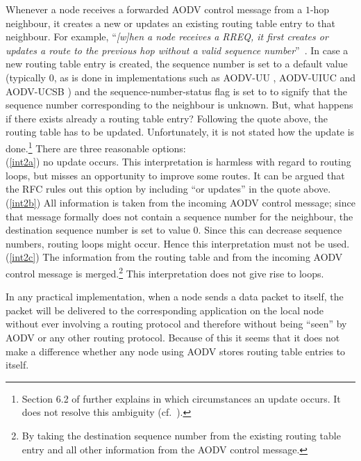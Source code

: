 \documentclass[letterpaper]{sig-alternate-pages}
\newcommand{\rte}{routing table entry\xspace}
\newcommand{\rtes}{routing table entries\xspace}
\renewcommand{\sf}{\it}
\begin{document}
Whenever a node receives a forwarded AODV control message from a $1$-hop neighbour, it creates a new or updates an existing \rte to that neighbour.
For example, ``{\sf [w]hen a node receives a RREQ, it first creates or updates a route to
   the previous hop without a valid sequence number\/}''~\cite[Sect.~6.5]{rfc3561}.
In case a new \rte is created, the sequence number is set to a default value (typically $0$, as is done in implementations such as AODV-UU \cite{AODVUU}, AODV-UIUC \cite{Kawadia03} and AODV-UCSB \cite{CB04}) and the sequence-number-status flag is set to {\unkno} to signify that the sequence number corresponding to the neighbour is unknown. 
But, what happens if there exists already a \rte?
Following the quote above, the routing table has to be updated. Unfortunately, it is not stated 
how the update is done.\footnote{Section 6.2 of \cite{rfc3561} further explains in which
  circumstances an update occurs. It does not resolve this ambiguity (cf.~\cite{TR11}).}
There are three reasonable options:\\
(\ref{int2a}) no update occurs.
This interpretation is harmless with regard to routing loops, but misses an opportunity to improve some routes.
It can be argued that the RFC rules out this option by including ``or updates'' in the quote above.\\
(\ref{int2b}) All information is taken from the incoming AODV control message;
since that message formally does not contain a sequence number for the neighbour, the destination
sequence number is set to value $0$.
Since this can decrease sequence numbers, 
routing loops might occur. Hence this interpretation must not be used.\\
(\ref{int2c}) The information from the routing table
and from the incoming AODV control message is
merged.\footnote{By taking the destination sequence number from the
  existing \rte and all other information from the AODV
  control message.}
This interpretation does not give rise to 
loops.

In any practical implementation, when a node sends a data packet to itself, 
the packet will be delivered to the corresponding application on the 
local node without ever involving a routing protocol and therefore without being ``seen'' 
by AODV or any other routing protocol. 
Because of this it seems that it does not make a difference whether any node using AODV  stores \rtes to itself.
\end{document}
